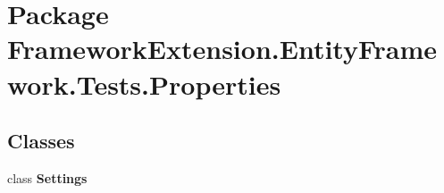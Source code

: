 \hypertarget{namespace_framework_extension_1_1_entity_framework_1_1_tests_1_1_properties}{\section{Package Framework\-Extension.\-Entity\-Framework.\-Tests.\-Properties}
\label{namespace_framework_extension_1_1_entity_framework_1_1_tests_1_1_properties}
}
\subsection*{Classes}
\begin{DoxyCompactItemize}
\item 
class {\bfseries Settings}
\end{DoxyCompactItemize}
